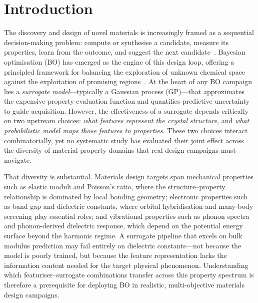 \section{Introduction}
\label{sec:introduction}

The discovery and design of novel materials is increasingly framed as a sequential decision-making problem: compute or synthesise a candidate, measure its properties, learn from the outcome, and suggest the next candidate~\cite{frazier2018tutorial}.
Bayesian optimisation (BO) has emerged as the engine of this design loop, offering a principled framework for balancing the exploration of unknown chemical space against the exploitation of promising regions~\cite{jones1998efficient,todorovic2019bayesian}.
At the heart of any BO campaign lies a \emph{surrogate model}---typically a Gaussian process (GP)---that approximates the expensive property-evaluation function and quantifies predictive uncertainty to guide acquisition.
However, the effectiveness of a surrogate depends critically on two upstream choices: \emph{what features represent the crystal structure}, and \emph{what probabilistic model maps those features to properties}.
These two choices interact combinatorially, yet no systematic study has evaluated their joint effect across the diversity of material property domains that real design campaigns must navigate.

That diversity is substantial.
Materials design targets span mechanical properties such as elastic moduli and Poisson's ratio, where the structure--property relationship is dominated by local bonding geometry; electronic properties such as band gap and dielectric constants, where orbital hybridisation and many-body screening play essential roles; and vibrational properties such as phonon spectra and phonon-derived dielectric response, which depend on the potential energy surface beyond the harmonic regime.
A surrogate pipeline that excels on bulk modulus prediction may fail entirely on dielectric constants---not because the model is poorly trained, but because the feature representation lacks the information content needed for the target physical phenomenon.
Understanding which featuriser--surrogate combinations transfer across this property spectrum is therefore a prerequisite for deploying BO in realistic, multi-objective materials design campaigns.

